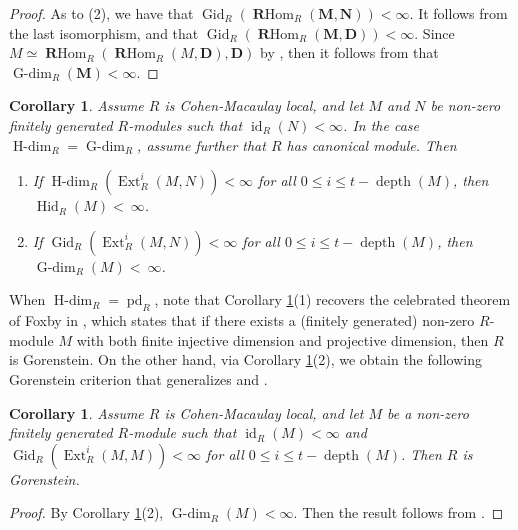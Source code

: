 \documentclass[11pt, a4paper,pagebackref]{amsart}
\numberwithin{equation}{section}
\newtheorem{corollary}[theorem]{Corollary}
\theoremstyle{definition}
\newtheorem{remark and definition}[theorem]{Remark and Definition}
\newtheorem{remark and notation}[theorem]{Remark and Notation}
\newcommand\Ext{\operatorname{Ext}}
\newcommand\RHom{\operatorname{\mathbf{R}Hom}}
\begin{document}
\begin{proof}
As to (2), we have that $\operatorname{Gid}_R(\RHom_R(\boldsymbol{M}, \boldsymbol{N}))<\infty$. It follows from 
 the last isomorphism, \cite[Proposition 4.1(b)]{CompleteIntersectionDimensionsandFoxbyClasses} and \cite[Theorem 4.4]{OnGorensteinProjectiveInjectiveAndFlatDimensionsAFunctorialDescriptionWithApplications} that  \linebreak $\operatorname{Gid}_R(\RHom_R(\boldsymbol{M}, \boldsymbol{D}))<\infty$. Since $M \simeq \RHom_R(\RHom_R(M,\boldsymbol{D}), \boldsymbol{D})$ by \cite[A.8.5]{GorensteinDimensions}, then it follows from \cite[Corollary 6.4]{OnGorensteinProjectiveInjectiveAndFlatDimensionsAFunctorialDescriptionWithApplications} that $\operatorname{G-dim}_R(\boldsymbol{M})<\infty$.
\end{proof}

\begin{corollary}\label{sqly}
    Assume $R$ is Cohen-Macaulay local, and let $M$ and $N$ be non-zero finitely generated $R$-modules  such that  $\operatorname{id}_R(N)<\infty$. In the case $\operatorname{H-dim}_R=\operatorname{G-dim}_R$, assume further that $R$ has canonical module. Then
    \begin{enumerate}[\rm(1)]
        \item If $\operatorname{H-dim}_R(\Ext_R^i(M,N))<\infty$ for all $0\leq i \leq t-\operatorname{depth} (M)$, then $\operatorname{Hid}_R(M)<~\infty$.
        \item If $\operatorname{Gid}_R(\Ext_R^i(M,N))<\infty$ for all $0\leq i \leq t-\operatorname{depth} (M)$, then $\operatorname{G-dim}_R(M)<~\infty$.
    \end{enumerate}
\end{corollary}



When $\operatorname{H-dim}_R=\operatorname{pd}_R$, note that Corollary \ref{sqly}(1) recovers the celebrated theorem of Foxby in \cite[Corollary 4.4]{isomorphismsbetweencomplexeswithapplicationstothehomologicaltheoryofmodules}, which states that if there exists a (finitely generated) non-zero $R$-module $M$ with both finite injective dimension and projective dimension, then $R$ is Gorenstein. On the other hand,  via Corollary \ref{sqly}(2), we obtain the following Gorenstein criterion that generalizes \cite[Corollary 4.7]{GorensteinringsviahomologicaldimensionsandsymmetryinvanishingofExtandTatecohomology}
 and \cite[Corollary 4.4]{NumericalApectsofComplexesOfFiniteHomologicalDimensions}.
\begin{corollary}\label{Gor2}
        Assume $R$ is Cohen-Macaulay local, and let $M$ be a non-zero finitely generated $R$-module such that $\operatorname{id}_R(M)<\infty$ and $\operatorname{Gid}_R(\Ext_R^i(M,M))<\infty$ for all $0\leq i \leq t-\operatorname{depth}(M)$. Then $R$ is Gorenstein. 
\end{corollary}
\begin{proof}
    By Corollary \ref{sqly}(2), $\operatorname{G-dim}_R(M)<\infty$. Then the result follows from \cite[Theorem 6.3.2]{GorensteinDimensions}. 
\end{proof}
\end{document}
